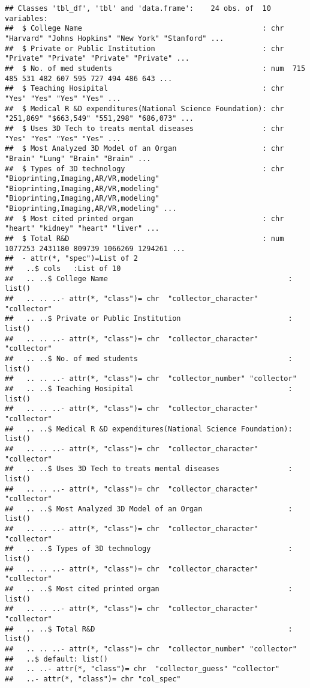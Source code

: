 \documentclass[]{article}
\begin{document}
\begin{verbatim}
## Classes 'tbl_df', 'tbl' and 'data.frame':    24 obs. of  10 variables:
##  $ College Name                                          : chr  "Harvard" "Johns Hopkins" "New York" "Stanford" ...
##  $ Private or Public Institution                         : chr  "Private" "Private" "Private" "Private" ...
##  $ No. of med students                                   : num  715 485 531 482 607 595 727 494 486 643 ...
##  $ Teaching Hosipital                                    : chr  "Yes" "Yes" "Yes" "Yes" ...
##  $ Medical R &D expenditures(National Science Foundation): chr  "251,869" "$663,549" "551,298" "686,073" ...
##  $ Uses 3D Tech to treats mental diseases                : chr  "Yes" "Yes" "Yes" "Yes" ...
##  $ Most Analyzed 3D Model of an Organ                    : chr  "Brain" "Lung" "Brain" "Brain" ...
##  $ Types of 3D technology                                : chr  "Bioprinting,Imaging,AR/VR,modeling" "Bioprinting,Imaging,AR/VR,modeling" "Bioprinting,Imaging,AR/VR,modeling" "Bioprinting,Imaging,AR/VR,modeling" ...
##  $ Most cited printed organ                              : chr  "heart" "kidney" "heart" "liver" ...
##  $ Total R&D                                             : num  1077253 2431180 809739 1066269 1294261 ...
##  - attr(*, "spec")=List of 2
##   ..$ cols   :List of 10
##   .. ..$ College Name                                          : list()
##   .. .. ..- attr(*, "class")= chr  "collector_character" "collector"
##   .. ..$ Private or Public Institution                         : list()
##   .. .. ..- attr(*, "class")= chr  "collector_character" "collector"
##   .. ..$ No. of med students                                   : list()
##   .. .. ..- attr(*, "class")= chr  "collector_number" "collector"
##   .. ..$ Teaching Hosipital                                    : list()
##   .. .. ..- attr(*, "class")= chr  "collector_character" "collector"
##   .. ..$ Medical R &D expenditures(National Science Foundation): list()
##   .. .. ..- attr(*, "class")= chr  "collector_character" "collector"
##   .. ..$ Uses 3D Tech to treats mental diseases                : list()
##   .. .. ..- attr(*, "class")= chr  "collector_character" "collector"
##   .. ..$ Most Analyzed 3D Model of an Organ                    : list()
##   .. .. ..- attr(*, "class")= chr  "collector_character" "collector"
##   .. ..$ Types of 3D technology                                : list()
##   .. .. ..- attr(*, "class")= chr  "collector_character" "collector"
##   .. ..$ Most cited printed organ                              : list()
##   .. .. ..- attr(*, "class")= chr  "collector_character" "collector"
##   .. ..$ Total R&D                                             : list()
##   .. .. ..- attr(*, "class")= chr  "collector_number" "collector"
##   ..$ default: list()
##   .. ..- attr(*, "class")= chr  "collector_guess" "collector"
##   ..- attr(*, "class")= chr "col_spec"
\end{verbatim}
\end{document}
